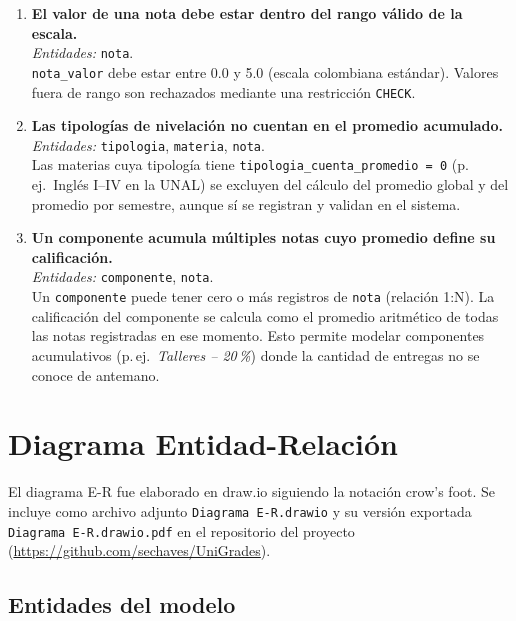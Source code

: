 \documentclass[12pt, letterpaper, twoside]{article}
\begin{document}
\begin{enumerate}[leftmargin=*, label=\textbf{RN-\arabic*.}]
  \item \textbf{El valor de una nota debe estar dentro del rango válido de la escala.}\\
  \textit{Entidades:} \texttt{nota}.\\
  \texttt{nota\_valor} debe estar entre 0.0 y 5.0 (escala colombiana estándar).
  Valores fuera de rango son rechazados mediante una restricción \texttt{CHECK}.

  \item \textbf{Las tipologías de nivelación no cuentan en el promedio acumulado.}\\
  \textit{Entidades:} \texttt{tipologia}, \texttt{materia}, \texttt{nota}.\\
  Las materias cuya tipología tiene \texttt{tipologia\_cuenta\_promedio = 0}
  (p.\,ej.\ Inglés I--IV en la UNAL) se excluyen del cálculo del promedio global
  y del promedio por semestre, aunque sí se registran y validan en el sistema.

  \item \textbf{Un componente acumula múltiples notas cuyo promedio define su calificación.}\\
  \textit{Entidades:} \texttt{componente}, \texttt{nota}.\\
  Un \texttt{componente} puede tener cero o más registros de \texttt{nota}
  (relación 1:N). La calificación del componente se calcula como el promedio
  aritmético de todas las notas registradas en ese momento. Esto permite modelar
  componentes acumulativos (p.\,ej.\ \textit{Talleres -- 20\,\%}) donde la
  cantidad de entregas no se conoce de antemano.

\end{enumerate}

\section{Diagrama Entidad-Relación}
\label{sec:er}

El diagrama E-R fue elaborado en draw.io siguiendo la notación crow's foot.
Se incluye como archivo adjunto \texttt{Diagrama E-R.drawio} y su versión
exportada \texttt{Diagrama E-R.drawio.pdf} en el repositorio del proyecto
(\url{https://github.com/sechaves/UniGrades}).

\subsection{Entidades del modelo}
\end{document}
